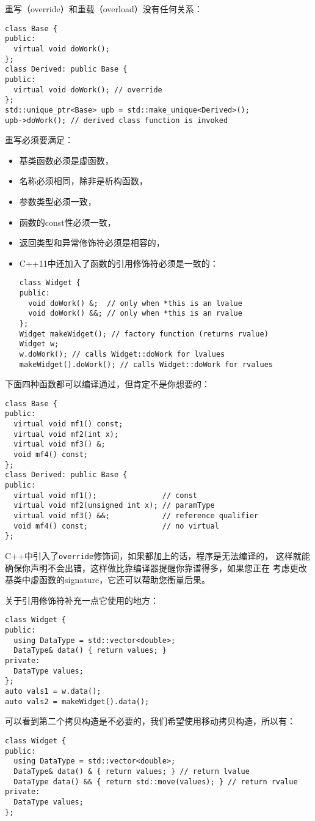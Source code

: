 重写（override）和重载（overload）没有任何关系：
\begin{verbatim}
class Base {
public:
  virtual void doWork(); 
};
class Derived: public Base {
public:
  virtual void doWork(); // override
}; 
std::unique_ptr<Base> upb = std::make_unique<Derived>();
upb->doWork(); // derived class function is invoked
\end{verbatim}
重写必须要满足：
\begin{itemize}
\item 基类函数必须是虚函数，
\item 名称必须相同，除非是析构函数，
\item 参数类型必须一致，
\item  函数的const性必须一致，
\item 返回类型和异常修饰符必须是相容的，
\item C++11中还加入了函数的引用修饰符必须是一致的：
\begin{verbatim}
class Widget {
public:
  void doWork() &;  // only when *this is an lvalue
  void doWork() &&; // only when *this is an rvalue
}; 
Widget makeWidget(); // factory function (returns rvalue)
Widget w;
w.doWork(); // calls Widget::doWork for lvalues
makeWidget().doWork(); // calls Widget::doWork for rvalues
\end{verbatim}
\end{itemize}

下面四种函数都可以编译通过，但肯定不是你想要的：
\begin{verbatim}
class Base {
public:
  virtual void mf1() const;
  virtual void mf2(int x);
  virtual void mf3() &;
  void mf4() const;
};
class Derived: public Base {
public:
  virtual void mf1();               // const
  virtual void mf2(unsigned int x); // paramType
  virtual void mf3() &&;            // reference qualifier
  void mf4() const;                 // no virtual
};
\end{verbatim}
C++中引入了\texttt{override}修饰词，如果都加上的话，程序是无法编译的，
这样就能确保你声明不会出错，这样做比靠编译器提醒你靠谱得多，如果您正在
考虑更改基类中虚函数的signature，它还可以帮助您衡量后果。

关于引用修饰符补充一点它使用的地方：
\begin{verbatim}
class Widget {
public:
  using DataType = std::vector<double>; 
  DataType& data() { return values; }
private:
  DataType values;
};
auto vals1 = w.data();
auto vals2 = makeWidget().data();
\end{verbatim}
可以看到第二个拷贝构造是不必要的，我们希望使用移动拷贝构造，所以有：
\begin{verbatim}
class Widget {
public:
  using DataType = std::vector<double>;
  DataType& data() & { return values; } // return lvalue
  DataType data() && { return std::move(values); } // return rvalue
private:
  DataType values;
};
\end{verbatim}

